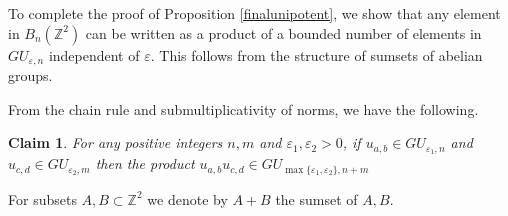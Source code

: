 \documentclass[10pt,reqno]{amsart}
\theoremstyle{Theorem}
\newtheorem{claim}[theorem]{Claim}
\theoremstyle{definition}
\theoremstyle{remark}
\newcommand{\note}[1]{\marginpar{{\color{red}\footnotesize \begin{spacing}{1}#1\end{spacing}}}}
\renewcommand{\epsilon}{\varepsilon}
\newcommand{\Z}{\mathbb {Z}}
\newcommand{\e}{\epsilon}
\begin{document}
To complete the proof  of Proposition \ref{finalunipotent}, we show  that any element in $B_n(\Z^2)$ can be written as a product of a bounded number of elements in $GU_{\e,n}$ independent of $\e$.  This follows from the structure of sumsets of  abelian groups.  %

From the chain rule and submultiplicativity of norms, we have the following.



\begin{claim}\label{trivialchain}
For any positive integers $n,m$ and $\e_1, \e_2 > 0$, if  $u_{a,b} \in GU_{\e_1,n}$ and $u_{c,d} \in GU_{\e_2,m}$   then the product $u_{a,b}u_{c,d} \in GU_{\max\{\e_1, \e_2\},n + m}$
\end{claim}



For subsets $A, B \subset \Z^2 $ we denote by     $A + B$ the sumset of $A, B$.   %
\end{document}
